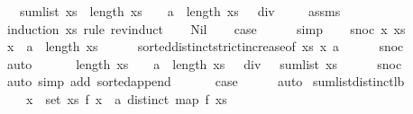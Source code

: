 \begin{isabellebody}
\ \ \ {\isachardoublequoteopen}sum{\isacharunderscore}list\ xs\ {\isasymge}\ length\ xs\ {\isacharasterisk}\ {\isacharparenleft}{}\ {\isacharasterisk}\ a\ {\isacharplus}\ length\ xs\ {\isacharplus}\ {}{\isacharparenright}\ div\ {}{\isachardoublequoteclose}\isanewline
%
\isadelimproof
\ \ %
\endisadelimproof
%
\isatagproof
{}\isamarkupfalse%
\ assms\ \ \ \ \ \ \ \ \ \ \ \ \isanewline
{}\isamarkupfalse%
\ {\isacharparenleft}induction\ xs\ rule{\isacharcolon}\ rev{\isacharunderscore}induct{\isacharparenright}\isanewline
\ \ \isamarkupfalse%
\ Nil\isanewline
\ \ \isamarkupfalse%
\ {\isacharquery}case\isanewline
\ \ \ \ \isamarkupfalse%
\ simp\isanewline
{}\isamarkupfalse%
\isanewline
\ \ \isamarkupfalse%
\ {\isacharparenleft}snoc\ x\ xs{\isacharparenright}\isanewline
\ \ \isamarkupfalse%
\ {\isachardoublequoteopen}x\ {\isachargreater}\ a\ {\isacharplus}\ length\ xs{\isachardoublequoteclose}\isanewline
\ \ \ \ \isamarkupfalse%
\ sorted{\isacharunderscore}distinct{\isacharunderscore}strict{\isacharunderscore}increase{\isacharbrackleft}of\ xs\ x\ a{\isacharbrackright}\isanewline
\ \ \ \ \isamarkupfalse%
\ snoc{\isacharparenleft}{}{\isacharminus}{\isacharparenright}\isanewline
\ \ \ \ \isamarkupfalse%
\ auto\isanewline
\ \ \isamarkupfalse%
\isanewline
\ \ \isamarkupfalse%
\ {\isachardoublequoteopen}length\ xs\ {\isacharasterisk}\ {\isacharparenleft}{}\ {\isacharasterisk}\ a\ {\isacharplus}\ length\ xs\ {\isacharplus}\ {}{\isacharparenright}\ div\ {}\ {\isasymle}\ sum{\isacharunderscore}list\ xs{\isachardoublequoteclose}\isanewline
\ \ \ \ \isamarkupfalse%
\ snoc\isanewline
\ \ \ \ \isamarkupfalse%
\ {\isacharparenleft}auto\ simp\ add{\isacharcolon}\ sorted{\isacharunderscore}append{\isacharparenright}\isanewline
\ \ \isamarkupfalse%
\isanewline
\ \ \isamarkupfalse%
\ {\isacharquery}case\isanewline
\ \ \ \ \isamarkupfalse%
\ auto\isanewline
{}\isamarkupfalse%
%
\endisatagproof
{\isafoldproof}%
%
\isadelimproof
\isanewline
%
\endisadelimproof
\isanewline
{}\isamarkupfalse%
\ sum{\isacharunderscore}list{\isacharunderscore}distinct{\isacharunderscore}lb{\isacharcolon}\isanewline
\ \ \ {\isachardoublequoteopen}{\isasymforall}\ x\ {\isasymin}\ set\ xs{\isachardot}\ f\ x\ {\isachargreater}\ a{\isachardoublequoteclose}\ {\isachardoublequoteopen}distinct\ {\isacharparenleft}map\ f\ xs{\isacharparenright}{\isachardoublequoteclose}\isanewline

\end{isabellebody}
